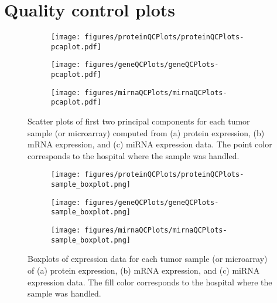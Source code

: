 


\section{Quality control plots\label{app:qc-plots}}


\begin{figure}[!h]
	\centering
	\begin{subfigure}{.7\textwidth}
		\centering
		\texttt{[image: figures/proteinQCPlots/proteinQCPlots-pcaplot.pdf]}
	\end{subfigure}
	\begin{subfigure}{.48\textwidth}
		\centering
		\texttt{[image: figures/geneQCPlots/geneQCPlots-pcaplot.pdf]}
	\end{subfigure}
	\begin{subfigure}{.48\textwidth}
		\centering
		\texttt{[image: figures/mirnaQCPlots/mirnaQCPlots-pcaplot.pdf]}
	\end{subfigure}%
	\caption{Scatter plots of first two principal components for each tumor sample (or microarray)
	computed from (a) protein expression, (b) mRNA expression, and (c) miRNA expression data.
	The point color corresponds to the hospital where the sample was handled.}
	\label{fig:test}
\end{figure}


\begin{figure}
	\centering
	\begin{subfigure}{1\textwidth}
		\centering
		\texttt{[image: figures/proteinQCPlots/proteinQCPlots-sample\_boxplot.png]}
	\end{subfigure}
	\begin{subfigure}{1\textwidth}
		\centering
		\texttt{[image: figures/geneQCPlots/geneQCPlots-sample\_boxplot.png]}
	\end{subfigure}
	\begin{subfigure}{1\textwidth}
		\centering
		\texttt{[image: figures/mirnaQCPlots/mirnaQCPlots-sample\_boxplot.png]}
	\end{subfigure}%
	\caption{Boxplots of expression data for each tumor sample (or microarray) of
	(a) protein expression, (b) mRNA expression, and (c) miRNA expression data. 
	The fill color corresponds to the hospital where the sample was handled.}
	\label{fig:test}
\end{figure}


